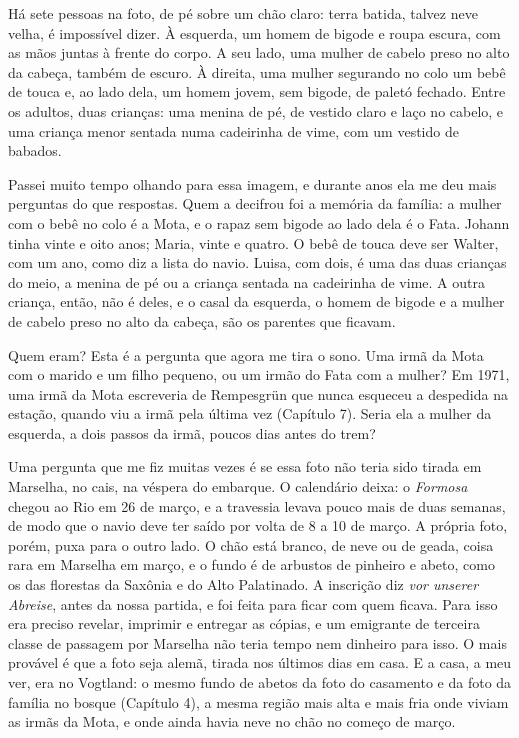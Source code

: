 \documentclass[
  brazilian,
  11pt,
  openany]{book}
\begin{document}
Há sete pessoas na foto, de pé sobre um chão claro: terra batida, talvez
neve velha, é impossível dizer. À esquerda, um homem de bigode e roupa
escura, com as mãos juntas à frente do corpo. A seu lado, uma mulher de
cabelo preso no alto da cabeça, também de escuro. À direita, uma mulher
segurando no colo um bebê de touca e, ao lado dela, um homem jovem, sem
bigode, de paletó fechado. Entre os adultos, duas crianças: uma menina
de pé, de vestido claro e laço no cabelo, e uma criança menor sentada
numa cadeirinha de vime, com um vestido de babados.

Passei muito tempo olhando para essa imagem, e durante anos ela me deu
mais perguntas do que respostas. Quem a decifrou foi a memória da
família: a mulher com o bebê no colo é a Mota, e o rapaz sem bigode ao
lado dela é o Fata. Johann tinha vinte e oito anos; Maria, vinte e
quatro. O bebê de touca deve ser Walter, com um ano, como diz a lista do
navio. Luisa, com dois, é uma das duas crianças do meio, a menina de pé
ou a criança sentada na cadeirinha de vime. A outra criança, então, não
é deles, e o casal da esquerda, o homem de bigode e a mulher de cabelo
preso no alto da cabeça, são os parentes que ficavam.

Quem eram? Esta é a pergunta que agora me tira o sono. Uma irmã da Mota
com o marido e um filho pequeno, ou um irmão do Fata com a mulher? Em
1971, uma irmã da Mota escreveria de Rempesgrün que nunca esqueceu a
despedida na estação, quando viu a irmã pela última vez (Capítulo 7).
Seria ela a mulher da esquerda, a dois passos da irmã, poucos dias antes
do trem?

Uma pergunta que me fiz muitas vezes é se essa foto não teria sido
tirada em Marselha, no cais, na véspera do embarque. O calendário deixa:
o \emph{Formosa} chegou ao Rio em 26 de março, e a travessia levava
pouco mais de duas semanas, de modo que o navio deve ter saído por volta
de 8 a 10 de março. A própria foto, porém, puxa para o outro lado. O
chão está branco, de neve ou de geada, coisa rara em Marselha em março,
e o fundo é de arbustos de pinheiro e abeto, como os das florestas da
Saxônia e do Alto Palatinado. A inscrição diz \emph{vor unserer
Abreise}, antes da nossa partida, e foi feita para ficar com quem
ficava. Para isso era preciso revelar, imprimir e entregar as cópias, e
um emigrante de terceira classe de passagem por Marselha não teria tempo
nem dinheiro para isso. O mais provável é que a foto seja alemã, tirada
nos últimos dias em casa. E a casa, a meu ver, era no Vogtland: o mesmo
fundo de abetos da foto do casamento e da foto da família no bosque
(Capítulo 4), a mesma região mais alta e mais fria onde viviam as irmãs
da Mota, e onde ainda havia neve no chão no começo de março.
\end{document}
